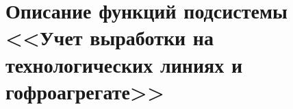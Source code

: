 \section{Описание функций подсистемы <<Учет выработки на технологических линиях и гофроагрегате>>}


%








%

%

% 



% 